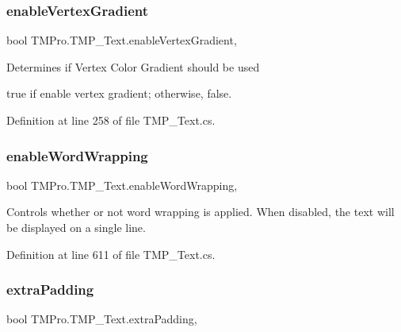 \subsubsection{\texorpdfstring{enableVertexGradient}{enableVertexGradient}}
{\footnotesize\ttfamily bool T\+M\+Pro.\+T\+M\+P\+\_\+\+Text.\+enable\+Vertex\+Gradient\hspace{0.3cm}{\ttfamily [get]}, {\ttfamily [set]}}



Determines if Vertex Color Gradient should be used 

{\ttfamily true} if enable vertex gradient; otherwise, {\ttfamily false}.

Definition at line 258 of file T\+M\+P\+\_\+\+Text.\+cs.

\mbox{\label{class_t_m_pro_1_1_t_m_p___text_a9add0d44e7faabf1070b2ace2ac89378}} 
\subsubsection{\texorpdfstring{enableWordWrapping}{enableWordWrapping}}
{\footnotesize\ttfamily bool T\+M\+Pro.\+T\+M\+P\+\_\+\+Text.\+enable\+Word\+Wrapping\hspace{0.3cm}{\ttfamily [get]}, {\ttfamily [set]}}



Controls whether or not word wrapping is applied. When disabled, the text will be displayed on a single line. 



Definition at line 611 of file T\+M\+P\+\_\+\+Text.\+cs.

\mbox{\label{class_t_m_pro_1_1_t_m_p___text_aa06b7d7a7054e899c0be4fa8ed9943b5}} 
\subsubsection{\texorpdfstring{extraPadding}{extraPadding}}
{\footnotesize\ttfamily bool T\+M\+Pro.\+T\+M\+P\+\_\+\+Text.\+extra\+Padding\hspace{0.3cm}{\ttfamily [get]}, {\ttfamily [set]}}



